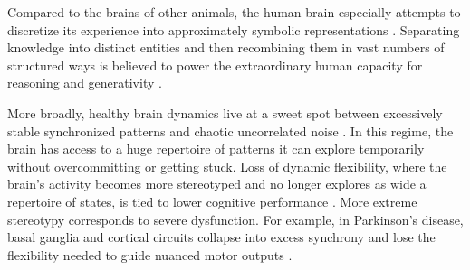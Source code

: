 \documentclass[11pt]{article}
\begin{document}
Compared to the brains of other animals, the human brain especially attempts to discretize its experience into approximately symbolic representations \citep{dehaene2022symbols, touretzky1988distributed, smolensky1990tensor, behrens2018cognitive}. Separating knowledge into distinct entities and then recombining them in vast numbers of structured ways is believed to power the extraordinary human capacity for reasoning and generativity \citep{fodor1975language, pinker1994language, lake2015human, chomsky1957syntactic, kurth2023replay, schacter2007remembering}. 

More broadly, healthy brain dynamics live at a sweet spot between excessively stable synchronized patterns and chaotic uncorrelated noise \citep{chialvo2010emergent, tognoli2014metastable, deco2011emerging, shew2011information, rabinovich2008transient, haldeman2005critical}. In this regime, the brain has access to a huge repertoire of patterns it can explore temporarily without overcommitting or getting stuck. Loss of dynamic flexibility, where the brain's activity becomes more stereotyped and no longer explores as wide a repertoire of states, is tied to lower cognitive performance \citep{grady2014understanding, cocchi2017criticality, muller2025critical}. More extreme stereotypy corresponds to severe dysfunction. For example, in Parkinson's disease, basal ganglia and cortical circuits collapse into excess synchrony and lose the flexibility needed to guide nuanced motor outputs \citep{hammond2007pathological, brown2003rhythmic}. 





\end{document}
